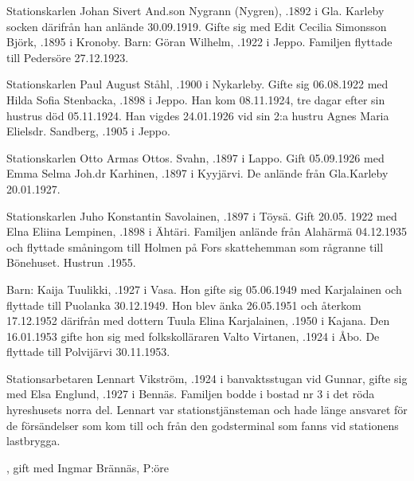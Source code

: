 {Stationskarlen Johan Sivert And.son Nygrann (Nygren), .1892 i Gla. Karleby socken därifrån han anlände 30.09.1919. Gifte sig med Edit Cecilia Simonsson Björk, .1895 i Kronoby.
Barn: Göran Wilhelm, .1922 i Jeppo.
Familjen flyttade till Pedersöre 27.12.1923.


Stationskarlen Paul August Ståhl, .1900 i Nykarleby. Gifte sig 06.08.1922 med Hilda Sofia Stenbacka, .1898 i Jeppo. Han kom 08.11.1924, tre dagar efter sin hustrus död 05.11.1924. Han vigdes 24.01.1926 vid sin 2:a hustru Agnes Maria Elielsdr. Sandberg, .1905 i Jeppo.
\begin{jhchildren}
  \item {}
  \item {}
  \item {}
  \item {}
  \item {}
\end{jhchildren}


Stationskarlen Otto Armas Ottos. Svahn, .1897 i Lappo. Gift 05.09.1926 med Emma Selma Joh.dr Karhinen, .1897 i Kyyjärvi. De anlände från Gla.Karleby 20.01.1927.


Stationskarlen Juho Konstantin Savolainen, .1897 i Töysä. Gift 20.05. 1922 med Elna Eliina Lempinen, .1898 i Ähtäri. Familjen anlände från Alahärmä 04.12.1935 och flyttade småningom till Holmen på Fors skattehemman som rågranne till Bönehuset. Hustrun .1955.

Barn: Kaija Tuulikki, .1927 i Vasa. Hon gifte sig 05.06.1949 med Karjalainen och flyttade till Puolanka 30.12.1949. Hon blev änka 26.05.1951 och återkom 17.12.1952 därifrån med dottern Tuula Elina Karjalainen, .1950 i Kajana. Den 16.01.1953 gifte hon sig med folkskolläraren Valto Virtanen, .1924 i Åbo. De flyttade till Polvijärvi 30.11.1953.


Stationsarbetaren Lennart Vikström, .1924 i banvaktsstugan vid Gunnar, gifte sig med Elsa Englund, .1927 i Bennäs. Familjen bodde i bostad nr 3 i det röda hyreshusets norra del. Lennart var stationstjänsteman och hade länge ansvaret för de försändelser som kom till och från den godsterminal som fanns vid stationens lastbrygga.
\begin{jhchildren}
  \item {}, gift med Ingmar Brännäs, P:öre
  \item {}
\end{jhchildren}


}

